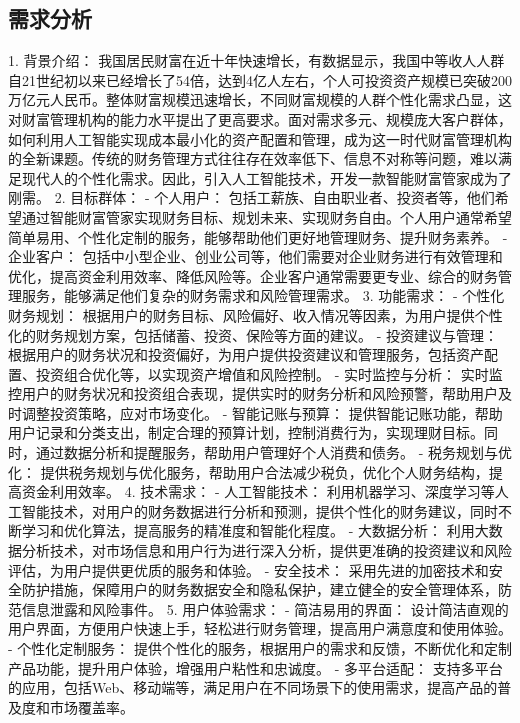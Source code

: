 \subsection{需求分析}
1. 背景介绍：
我国居民财富在近十年快速增长，有数据显示，我国中等收人人群自21世纪初以来已经增长了54倍，达到4亿人左右，个人可投资资产规模已突破200万亿元人民币。整体财富规模迅速增长，不同财富规模的人群个性化需求凸显，这对财富管理机构的能力水平提出了更高要求。面对需求多元、规模庞大客户群体，如何利用人工智能实现成本最小化的资产配置和管理，成为这一时代财富管理机构的全新课题。传统的财务管理方式往往存在效率低下、信息不对称等问题，难以满足现代人的个性化需求。因此，引入人工智能技术，开发一款智能财富管家成为了刚需。
2. 目标群体：
- 个人用户： 包括工薪族、自由职业者、投资者等，他们希望通过智能财富管家实现财务目标、规划未来、实现财务自由。个人用户通常希望简单易用、个性化定制的服务，能够帮助他们更好地管理财务、提升财务素养。
- 企业客户： 包括中小型企业、创业公司等，他们需要对企业财务进行有效管理和优化，提高资金利用效率、降低风险等。企业客户通常需要更专业、综合的财务管理服务，能够满足他们复杂的财务需求和风险管理需求。
3. 功能需求：
- 个性化财务规划： 根据用户的财务目标、风险偏好、收入情况等因素，为用户提供个性化的财务规划方案，包括储蓄、投资、保险等方面的建议。
- 投资建议与管理： 根据用户的财务状况和投资偏好，为用户提供投资建议和管理服务，包括资产配置、投资组合优化等，以实现资产增值和风险控制。
- 实时监控与分析： 实时监控用户的财务状况和投资组合表现，提供实时的财务分析和风险预警，帮助用户及时调整投资策略，应对市场变化。
- 智能记账与预算： 提供智能记账功能，帮助用户记录和分类支出，制定合理的预算计划，控制消费行为，实现理财目标。同时，通过数据分析和提醒服务，帮助用户管理好个人消费和债务。
- 税务规划与优化： 提供税务规划与优化服务，帮助用户合法减少税负，优化个人财务结构，提高资金利用效率。
4. 技术需求：
- 人工智能技术： 利用机器学习、深度学习等人工智能技术，对用户的财务数据进行分析和预测，提供个性化的财务建议，同时不断学习和优化算法，提高服务的精准度和智能化程度。
- 大数据分析： 利用大数据分析技术，对市场信息和用户行为进行深入分析，提供更准确的投资建议和风险评估，为用户提供更优质的服务和体验。
- 安全技术： 采用先进的加密技术和安全防护措施，保障用户的财务数据安全和隐私保护，建立健全的安全管理体系，防范信息泄露和风险事件。
5. 用户体验需求：
- 简洁易用的界面： 设计简洁直观的用户界面，方便用户快速上手，轻松进行财务管理，提高用户满意度和使用体验。
- 个性化定制服务： 提供个性化的服务，根据用户的需求和反馈，不断优化和定制产品功能，提升用户体验，增强用户粘性和忠诚度。
- 多平台适配： 支持多平台的应用，包括Web、移动端等，满足用户在不同场景下的使用需求，提高产品的普及度和市场覆盖率。

